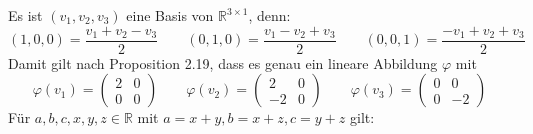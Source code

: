 \documentclass[a4paper,graphics,11pt]{article}
\begin{document}
Es ist $(v_1, v_2, v_3)$ eine Basis von $\mathbb{R}^{3\times 1}$, denn:
$$
    (1,0,0) = \frac{v_1 + v_2 - v_3}{2}
    \qquad
    (0,1,0) = \frac{v_1 - v_2 + v_3}{2}
    \qquad
    (0,0,1) = \frac{-v_1 + v_2 + v_3}{2}
$$
Damit gilt nach Proposition 2.19, dass es genau ein lineare Abbildung $\varphi$ mit
$$
    \varphi(v_1) =
\begin{pmatrix}
    2 & 0\\
    0 & 0
\end{pmatrix}
\qquad
\varphi(v_2) =
\begin{pmatrix}
    2 & 0\\
    -2 & 0
\end{pmatrix}
\qquad
\varphi(v_3) =
\begin{pmatrix}
    0 & 0\\
    0 & -2
\end{pmatrix}
$$
Für $a,b,c,x,y,z \in \mathbb{R}$ mit $a = x+y, b = x+z, c = y+z$ gilt:
\end{document}
